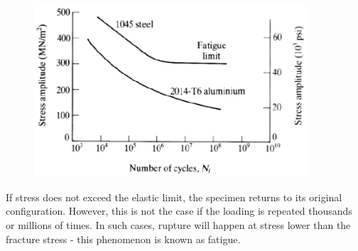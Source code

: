 \begin{figure}[!h]
\centering
\includegraphics[angle=0, width=4in]{Material Properties-Figures/SN Curve.png}
\vspace{-2mm}
\caption{\small {}}
\vspace{-3mm}
\label{Fig:SNCurve}
\end{figure}

\noindent If stress does not exceed the elastic limit, the specimen returns to its original configuration. However, this is not the case if the loading is repeated thousands or millions of times. In such cases, rupture will happen at stress lower than the fracture stress - this phenomenon is known as fatigue.
